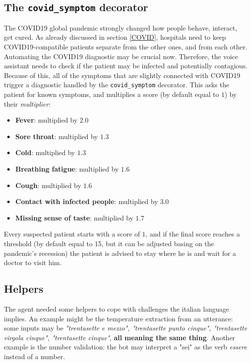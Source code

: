 \documentclass[conference]{IEEEtran}
\begin{document}
\subsection{The \texttt{covid\_symptom} decorator}
The COVID19 global pandemic strongly changed how people behave, interact, get cured. As already discussed in section \ref{COVID}, hospitals need to keep COVID19-compatible patients separate from the other ones, and from each other. Automating the COVID19 diagnostic may be crucial now. Therefore, the voice assistant needs to check if the patient may be infected and potentially contagious.
Because of this, all of the symptoms that are slightly connected with COVID19 trigger a diagnostic handled by the \texttt{covid\_symptom} decorator.
This asks the patient for known symptoms\cite{paginemediche}, and multiplies a score (by default equal to $1$) by their \textit{multiplier}:
\begin{itemize}
    \item \textbf{Fever}: multiplied by $2.0$
    \item \textbf{Sore throat}: multiplied by $1.3$
    \item \textbf{Cold}: multiplied by $1.3$
    \item \textbf{Breathing fatigue}: multiplied by $1.6$
    \item \textbf{Cough}: multiplied by $1.6$
    \item \textbf{Contact with infected people}: multiplied by $3.0$
    \item \textbf{Missing sense of taste}: multiplied by $1.7$
\end{itemize}
Every suspected patient starts with a score of $1$, and if the final score reaches a threshold (by default equal to 15, but it can be adjusted basing on the pandemic's recession) the patient is advised to stay where he is and wait for a doctor to visit him.
\subsection{Helpers}
The agent needed some helpers to cope with challenges the italian language implies. An example might be the temperature extraction from an utterance: some inputs may be \textit{"trentasette e mezzo", "trentasette punto cinque", "trentasette virgola cinque", "trentasette cinque"}, \textbf{all meaning the same thing}. Another example is the number validation: the bot may interpret a "sei" as the verb \textit{essere} instead of a number.
\end{document}

